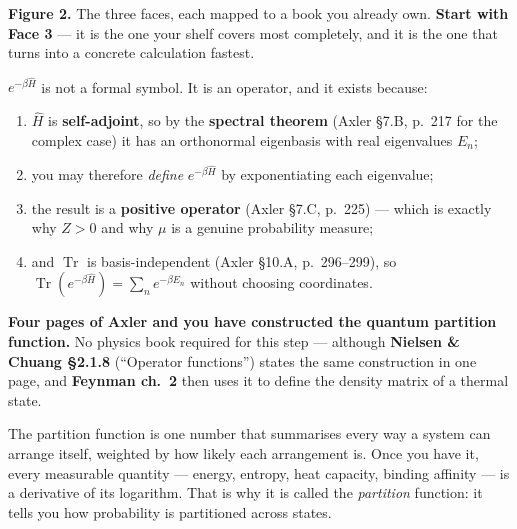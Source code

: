 \vspace{2pt}
\begin{center}\begin{minipage}{0.93\textwidth}\footnotesize\color{slate}
\textbf{Figure 2.}\; The three faces, each mapped to a book you already own.
\textbf{Start with Face 3} --- it is the one your shelf covers most completely, and it is the one that
turns into a concrete calculation fastest.
\end{minipage}\end{center}

\begin{keyidea}[title={Why Face 3 first, precisely}]
$e^{-\beta\hat H}$ is not a formal symbol. It is an operator, and it exists because:
\begin{enumerate}[label=\textbf{\arabic*.}]
\item $\hat H$ is \textbf{self-adjoint}, so by the \textbf{spectral theorem} (Axler §7.B, p.~217 for
 the complex case) it has an orthonormal eigenbasis with real eigenvalues $E_n$;
\item you may therefore \emph{define} $e^{-\beta\hat H}$ by exponentiating each eigenvalue;
\item the result is a \textbf{positive operator} (Axler §7.C, p.~225) --- which is exactly why
 $Z>0$ and why $\mu$ is a genuine probability measure;
\item and $\operatorname{Tr}$ is basis-independent (Axler §10.A, p.~296--299), so
 $\operatorname{Tr}(e^{-\beta\hat H})=\sum_n e^{-\beta E_n}$ without choosing coordinates.
\end{enumerate}
\textbf{Four pages of Axler and you have constructed the quantum partition function.} No physics
book required for this step --- although \textbf{Nielsen \& Chuang §2.1.8} (``Operator functions'')
states the same construction in one page, and \textbf{Feynman ch.~2} then uses it to define the
density matrix of a thermal state.
\end{keyidea}

\begin{plain}
The partition function is one number that summarises every way a system can arrange itself, weighted
by how likely each arrangement is. Once you have it, every measurable quantity --- energy, entropy,
heat capacity, binding affinity --- is a derivative of its logarithm. That is why it is called the
\emph{partition} function: it tells you how probability is partitioned across states.
\end{plain}
